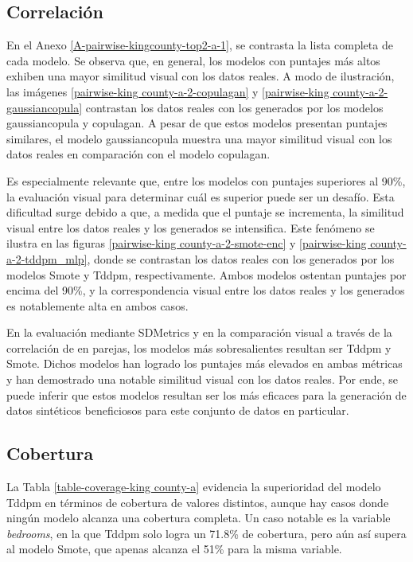 \newpage

\subsection{Correlación}
En el Anexo \ref{A-pairwise-kingcounty-top2-a-1}, se contrasta la lista completa de cada modelo. Se observa que, en general, los modelos con puntajes más altos exhiben una mayor similitud visual con los datos reales. A modo de ilustración, las imágenes \ref{pairwise-king county-a-2-copulagan} y \ref{pairwise-king county-a-2-gaussiancopula} contrastan los datos reales con los generados por los modelos gaussiancopula y copulagan. A pesar de que estos modelos presentan puntajes similares, el modelo gaussiancopula muestra una mayor similitud visual con los datos reales en comparación con el modelo copulagan.



\newpage
Es especialmente relevante que, entre los modelos con puntajes superiores al 90\%, la evaluación visual para determinar cuál es superior puede ser un desafío. Esta dificultad surge debido a que, a medida que el puntaje se incrementa, la similitud visual entre los datos reales y los generados se intensifica. Este fenómeno se ilustra en las figuras \ref{pairwise-king county-a-2-smote-enc} y \ref{pairwise-king county-a-2-tddpm_mlp}, donde se contrastan los datos reales con los generados por los modelos Smote y Tddpm, respectivamente. Ambos modelos ostentan puntajes por encima del 90\%, y la correspondencia visual entre los datos reales y los generados es notablemente alta en ambos casos.




\newpage
En la evaluación mediante SDMetrics y en la comparación visual a través de la correlación de en parejas, los modelos más sobresalientes resultan ser Tddpm y Smote. Dichos modelos han logrado los puntajes más elevados en ambas métricas y han demostrado una notable similitud visual con los datos reales. Por ende, se puede inferir que estos modelos resultan ser los más eficaces para la generación de datos sintéticos beneficiosos para este conjunto de datos en particular.

\subsection{Cobertura}
La Tabla \ref{table-coverage-king county-a} evidencia la superioridad del modelo Tddpm en términos de cobertura de valores distintos, aunque hay casos donde ningún modelo alcanza una cobertura completa. Un caso notable es la variable \emph{bedrooms}, en la que Tddpm solo logra un 71.8\% de cobertura, pero aún así supera al modelo Smote, que apenas alcanza el 51\% para la misma variable.


